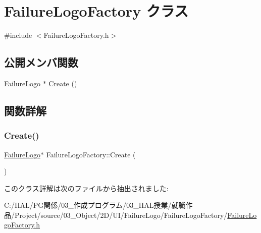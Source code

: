 \hypertarget{class_failure_logo_factory}{}\section{Failure\+Logo\+Factory クラス}
\label{class_failure_logo_factory}


{\ttfamily \#include $<$Failure\+Logo\+Factory.\+h$>$}

\subsection*{公開メンバ関数}
\begin{DoxyCompactItemize}
\item 
\mbox{\hyperlink{class_failure_logo}{Failure\+Logo}} $\ast$ \mbox{\hyperlink{class_failure_logo_factory_a623d73668a89fceca9dc013112b4c8a3}{Create}} ()
\end{DoxyCompactItemize}


\subsection{関数詳解}
\mbox{\label{class_failure_logo_factory_a623d73668a89fceca9dc013112b4c8a3}} 
\subsubsection{\texorpdfstring{Create()}{Create()}}
{\footnotesize\ttfamily \mbox{\hyperlink{class_failure_logo}{Failure\+Logo}}$\ast$ Failure\+Logo\+Factory\+::\+Create (\begin{DoxyParamCaption}{ }\end{DoxyParamCaption})\hspace{0.3cm}{\ttfamily [inline]}}



このクラス詳解は次のファイルから抽出されました\+:\begin{DoxyCompactItemize}
\item 
C\+:/\+H\+A\+L/\+P\+G関係/03\+\_\+作成プログラム/03\+\_\+\+H\+A\+L授業/就職作品/\+Project/source/03\+\_\+\+Object/2\+D/\+U\+I/\+Failure\+Logo/\+Failure\+Logo\+Factory/\mbox{\hyperlink{_failure_logo_factory_8h}{Failure\+Logo\+Factory.\+h}}\end{DoxyCompactItemize}
